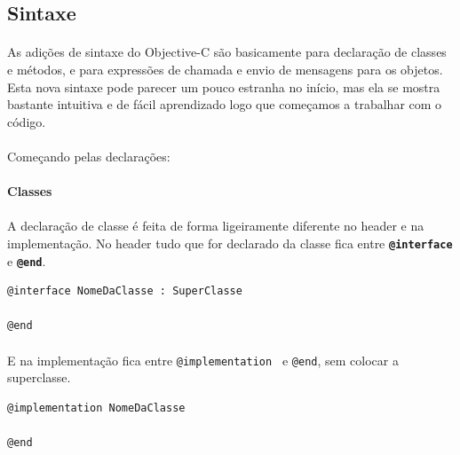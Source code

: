 \documentclass[a4paper,12pt,brazil,doubleside]{book}
\begin{document}
\bigskip 

\subsection{Sintaxe}

\paragraph{}As adições de sintaxe do Objective-C são basicamente para declaração de classes e métodos, e para expressões de chamada e envio de mensagens para os objetos. Esta nova sintaxe pode parecer um pouco estranha no início, mas ela se mostra bastante intuitiva e de fácil aprendizado logo que começamos a trabalhar com o código.
\paragraph{}Começando pelas declarações:

\bigskip 

\paragraph{}\textbf{Classes}

\paragraph{}A declaração de classe é feita de forma ligeiramente diferente no header e na implementação. No header tudo que for declarado da classe fica entre \texttt{\textbf{@interface}} e \texttt{\textbf{@end}}.

\begin{listing}
\begin{verbatim}
@interface NomeDaClasse : SuperClasse

@end
\end{verbatim}
\end{listing}

\paragraph{}E na implementação fica entre \texttt{@implementation
} e \texttt{@end}, sem colocar a superclasse.

\begin{listing}
\begin{verbatim}
@implementation NomeDaClasse

@end
\end{verbatim}
\end{listing}
\end{document}
